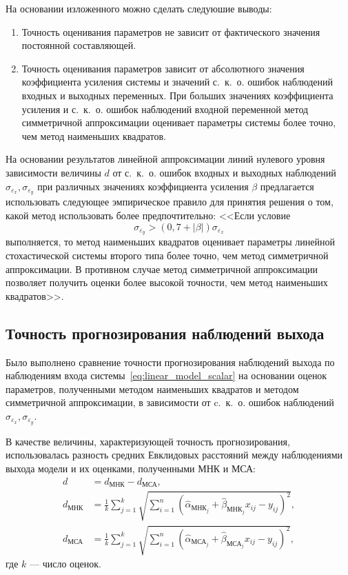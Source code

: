 На основании изложенного можно сделать следуюшие выводы:
\begin{enumerate}
\item Точность оценивания параметров не зависит от фактического значения
  постоянной составляющей.
\item Точность оценивания параметров зависит от абсолютного значения
  коэффициента усиления системы и значений с.~к.~о. ошибок наблюдений
  входных и выходных переменных.
  При больших значениях коэффициента усиления и с.~к.~о. ошибок наблюдений
  входной переменной метод симметричной аппроксимации оценивает параметры системы более точно,
  чем метод наименьших квадратов.
\end{enumerate}

На основании результатов линейной аппроксимации линий нулевого уровня
зависимости величины \( d \) от с.~к.~о. ошибок входных и выходных наблюдений
\( \sigma_{\varepsilon_x}, \sigma_{\varepsilon_y} \)
при различных значениях коэффициента усиления \( \beta \) предлагается использовать
следующее эмпирическое правило для принятия решения о том, какой метод
использовать более предпочтительно:
<<Если условие
\begin{equation}
  \sigma_{\varepsilon_y} > (0{,}7 + |\beta|) \sigma_{\varepsilon_x}
  \label{eq:linear_rule_param}
\end{equation}
выполняется, то метод наименьших квадратов оценивает параметры линейной
стохастической системы второго типа более точно, чем метод симметричной аппроксимации.
В противном случае метод симметричной аппроксимации позволяет получить
оценки более высокой точности, чем метод наименьших квадратов>>.

\vspace{2\baselineskip}
\subsection{Точность прогнозирования наблюдений выхода}

Было выполнено сравнение точности прогнозирования наблюдений выхода по
наблюдениям входа системы~\eqref{eq:linear_model_scalar} на основании оценок параметров,
полученными методом наименьших квадратов и методом симметричной аппроксимации,
в зависимости от c.~к.~о. ошибок наблюдений \( \sigma_{\varepsilon_x}, \sigma_{\varepsilon_y} \).

В качестве величины, характеризующей точность прогнозирования,
использовалась разность средних Евклидовых расстояний между наблюдениями выхода модели и
их оценками, полученными МНК и МСА:
\begin{equation*}
  \begin{aligned}
    d &= d_{\text{МНК}} - d_{\text{МСА}}, \\
    d_{\text{МНК}} &= \frac{1}{k} \sum_{j=1}^k \sqrt{ \sum_{i=1}^n (\hat{\alpha}_{\text{МНК}_j} + \hat{\beta}_{\text{МНК}_j} x_{ij} - y_{ij})^2}, \\
    d_{\text{МСА}} &= \frac{1}{k} \sum_{j=1}^k \sqrt{ \sum_{i=1}^n (\hat{\alpha}_{\text{МСА}_j} + \hat{\beta}_{\text{МСА}_j} x_{ij} - y_{ij})^2},
    \end{aligned}
  \end{equation*}
где \( k \) --- число оценок.

